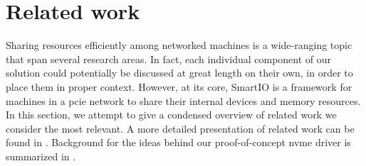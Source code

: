 





\section{Related work}\label{sec:rw}
Sharing resources efficiently among networked machines is a wide-ranging topic that span several research areas.
%
In fact, each individual component of our solution could potentially be discussed at great length on their own, in order to place them in proper context.
%
However, at its core, SmartIO is a framework for machines in a \gls{pcie} network to share their internal devices and memory resources.
%
In this section, we attempt to give a condensed overview of related work we consider the most relevant.
%
A more detailed presentation of related work can be found in .
%
Background for the ideas behind our proof-of-concept \gls{nvme} driver is summarized in .



